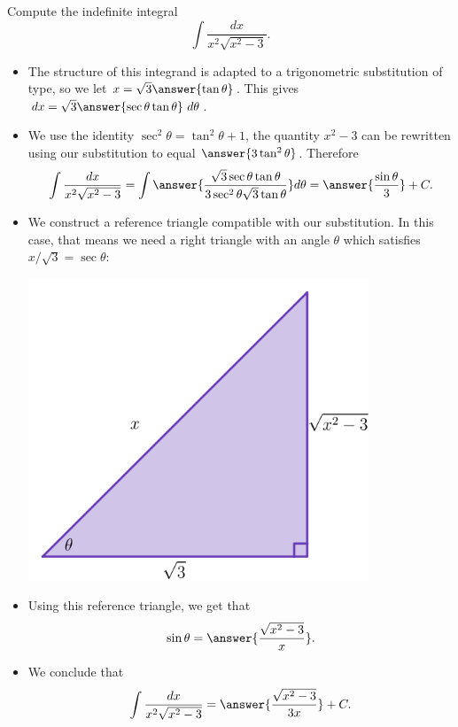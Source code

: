 \documentclass{ximera}
\begin{document}
\begin{example}
Compute the indefinite integral
\[ \int \frac{dx}{x^2 \sqrt{x^2 - 3}}. \]
\begin{itemize}
\item The structure of this integrand is adapted to a trigonometric substitution of  type, so we let $x = \sqrt{3} \answer{\tan \theta}$. This gives $dx = \sqrt{3} \answer{\sec \theta \tan \theta}~d \theta$.
\item We use the identity $\sec^2 \theta = \tan^2 \theta + 1$, the quantity $x^2 - 3$ can be rewritten using our substitution to equal $\answer{3 \tan^2 \theta}$. Therefore
\[ \int \frac{dx}{x^2 \sqrt{x^2 - 3}} = \int \answer{ \frac{\sqrt{3} \sec \theta \tan \theta}{3 \sec^2 \theta \sqrt{3} \tan \theta}} d \theta = \answer{\frac{\sin \theta}{3}} + C.\] 
\item We construct a reference triangle compatible with our substitution. In this case, that means we need a right triangle with an angle $\theta$ which satisfies $x/\sqrt{3} = \sec \theta$:
\begin{center}
\begin{image}
\includegraphics[width=4in]{images/trigsub03.png}
\end{image}
\end{center}
\item Using this reference triangle, we get that
\[ \sin \theta = \answer{\frac{\sqrt{x^2-3}}{x}}.\]
\item We conclude that
\[ \int \frac{dx}{x^2 \sqrt{x^2-3}} = \answer{ \frac{\sqrt{x^2-3}}{3x}} + C. \]
\end{itemize}
\end{example}
\end{document}
